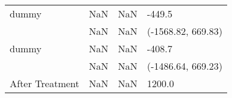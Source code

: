 \begin{tabular}{llll}
dummy           &                     NaN &                    NaN &                -449.5 \\
                &                     NaN &                    NaN &    (-1568.82, 669.83) \\
dummy           &                     NaN &                    NaN &                -408.7 \\
                &                     NaN &                    NaN &    (-1486.64, 669.23) \\
After Treatment &                     NaN &                    NaN &                1200.0 \\
\bottomrule
\end{tabular}
